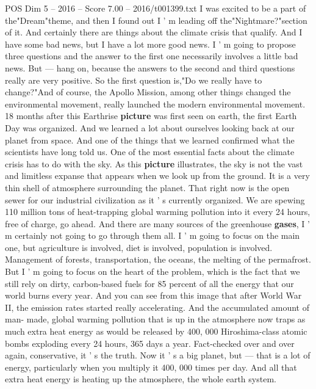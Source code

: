 \begin{textsample}{POS Dim 5 – 2016 – Score 7.00 – 2016/t001399.txt}  \label{ex:f5_pos_057}
I was excited to be a part of the"Dream"theme, and then I found out I ' m leading off the"Nightmare?"section of it.
And certainly there are things about the climate crisis that qualify.
And I have some bad news, but I have a lot more good news.
I ' m going to propose three questions and the answer to the first one necessarily involves a little bad news.
But — hang on, because the answers to the second and third questions really are very positive.
So the first question is,"Do we really have to change?"And of course, the Apollo Mission, among other things changed the environmental movement, really launched the modern environmental movement. 18 months after this Earthrise \textbf{picture} was first seen on earth, the first Earth Day was organized.
And we learned a lot about ourselves looking back at our planet from space.
And one of the things that we learned confirmed what the scientists have long told us.
One of the most essential facts about the climate crisis has to do with the sky.
As this \textbf{picture} illustrates, the sky is not the vast and limitless expanse that appears when we look up from the ground.
It is a very thin shell of atmosphere surrounding the planet.
That right now is the open sewer for our industrial civilization as it ' s currently organized.
We are spewing 110 million tons of heat-trapping global warming pollution into it every 24 hours, free of charge, go ahead.
And there are many sources of the greenhouse \textbf{gases}, I ' m certainly not going to go through them all.
I ' m going to focus on the main one, but agriculture is involved, diet is involved, population is involved.
Management of forests, transportation, the oceans, the melting of the permafrost.
But I ' m going to focus on the heart of the problem, which is the fact that we still rely on dirty, carbon-based fuels for 85 percent of all the energy that our world burns every year.
And you can see from this image that after World War II, the emission rates started really accelerating.
And the accumulated amount of man- made, global warming pollution that is up in the atmosphere now traps as much extra heat energy as would be released by 400, 000 Hiroshima-class atomic bombs exploding every 24 hours, 365 days a year.
Fact-checked over and over again, conservative, it ' s the truth.
Now it ' s a big planet, but — that is a lot of energy, particularly when you multiply it 400, 000 times per day.
And all that extra heat energy is heating up the atmosphere, the whole earth system.

\end{textsample}
